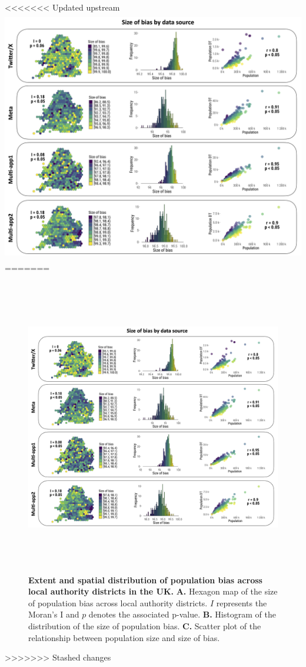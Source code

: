 \documentclass[]{rsos}%
\begin{document}
<<<<<<< Updated upstream
\includegraphics[width=5.55208in,height=4.35417in]{figures/Fig-size-bias.png}
=======
\begin{figure}
\centering
\includegraphics[width=14cm,height=13cm]{figures/Fig-size-bias.png}
\caption{\textbf{Extent and spatial distribution of population bias across local
authority districts in the UK.} \textbf{A.} Hexagon map of the size of
population bias across local authority districts. \(I\) represents the
Moran's I and \(p\) denotes the associated p-value. \textbf{B.} Histogram of
the distribution of the size of population bias. \textbf{C.} Scatter plot of
the relationship between population size and size of
bias.}\label{fig:bias-size}
\end{figure}
>>>>>>> Stashed changes
\end{document}
